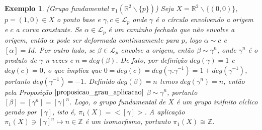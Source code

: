 \documentclass[12pt]{book}
\newtheorem{exemplo}[teorema]{Exemplo}
\newcommand{\caminhospontobase}[1]{\mathcal{L}_{#1}}
\newcommand{\classe}[1]{[#1]}
\newcommand{\grupofundamental}[1]{\pi_{1}(#1)}
\newcommand{\inteiros}{\mathbb{Z}}
\newcommand{\real}[1]{\mathbb{R}^{#1}}
\begin{document}
		\begin{exemplo}\label{exemplo_grupo_fundamental_plano_furo}
			(Grupo fundamental $\grupofundamental{\real{2}\backslash\{p\}}$) Seja $X = \real{2}\backslash \{(0,0)\}$, $p=(1,0) \in X$ o ponto base e $\gamma,c \in \caminhospontobase{p}$ onde $\gamma$ é o círculo envolvendo a origem e $c$ a curva constante. Se $\alpha \in \caminhospontobase{p}$ é um caminho fechado que não envolve a origem, então $\alpha$ pode ser deformada contínuamente para $p$, logo $\alpha \sim c$ e $\classe{\alpha} = Id$. Por outro lado, se $\beta \in \caminhospontobase{p}$ envolve a origem, então $\beta \sim \gamma^{n}$, onde $\gamma^{n}$ é o produto de $\gamma$ n-vezes e $n= deg(\beta)$. De fato, por definição $deg(\gamma) = 1$ e $deg(c) =0$, o que implica que $0= deg(c)=deg(\gamma.\gamma^{-1}) = 1 +deg(\gamma^{-1})$, portanto $deg(\gamma^{-1})=-1$. Definido $deg(\beta)=n$  temos $deg(\gamma^{n}) = n$, então pela Proposição $\ref{proposicao_grau_aplicacao}$ $\beta \sim \gamma^{n}$, portanto $\classe{\beta} =  \classe{\gamma^{n}}=\classe{\gamma}^{n}$. Logo, o grupo fundamental de $X$ é um grupo inifnito cíclico gerado por $\classe{\gamma}$, isto é, $\grupofundamental{X} = <\classe{\gamma}>$. A aplicação $\grupofundamental{X} \ni \classe{\gamma}^{n} \mapsto n \in \inteiros$ é um isomorfismo, portanto $\grupofundamental{X} \cong \inteiros$.
		\end{exemplo}
		
\end{document}
